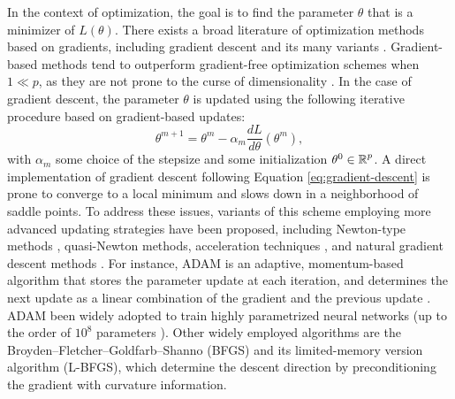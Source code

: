 In the context of optimization, the goal is to find the parameter $\theta$ that is a minimizer of $L(\theta)$. 
There exists a broad literature of optimization methods based on gradients, including gradient descent and its many variants \cite{ruder2016overview-gradient-descent}.
Gradient-based methods tend to outperform gradient-free optimization schemes when $1 \ll p$, as they are not prone to the curse of dimensionality \cite{Schartau2017}. 
In the case of gradient descent, the parameter $\theta$ is updated using the following iterative procedure based on gradient-based updates:
\begin{equation}\label{eq:gradient-descent}
    \theta^{m+1} 
    = 
    \theta^m 
    - 
    \alpha_m 
    \frac{dL}{d\theta}(\theta^m),
\end{equation}
with $\alpha_m$ some choice of the stepsize and some initialization $\theta^0 \in \operatorname{\mathbb{R}}^p$. 
A direct implementation of gradient descent following Equation \eqref{eq:gradient-descent} is prone to converge to a local minimum and slows down in a neighborhood of saddle points. 
To address these issues, variants of this scheme employing more advanced updating strategies have been proposed, including Newton-type methods \cite{second-order-optimization}, quasi-Newton methods, acceleration techniques \cite{JMLR:v22:20-207}, and natural gradient descent methods \cite{doi:10.1137/22M1477805}. 
For instance, ADAM is an adaptive, momentum-based algorithm  that stores the parameter update at each iteration, and determines the next update as a linear combination of the gradient and the previous update \cite{Kingma2014}.
ADAM been widely adopted to train highly parametrized neural networks (up to the order of $10^8$ parameters \cite{NIPS2017_3f5ee243}).
Other widely employed algorithms are the Broyden–Fletcher–Goldfarb–Shanno (BFGS) and its limited-memory version algorithm (L-BFGS), which determine the descent direction by preconditioning the gradient with curvature information. 


